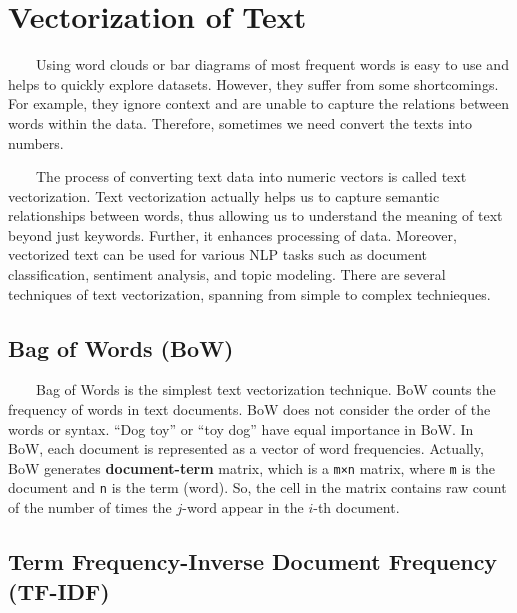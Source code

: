 \documentclass[
  letterpaper,
  DIV=11,
  numbers=noendperiod]{scrreprt}
\begin{document}
\section{Vectorization of Text}\label{vectorization-of-text}

~~~~Using word clouds or bar diagrams of most frequent words is easy to
use and helps to quickly explore datasets. However, they suffer from
some shortcomings. For example, they ignore context and are unable to
capture the relations between words within the data. Therefore,
sometimes we need convert the texts into numbers.

~~~~The process of converting text data into numeric vectors is called
text vectorization. Text vectorization actually helps us to capture
semantic relationships between words, thus allowing us to understand the
meaning of text beyond just keywords. Further, it enhances processing of
data. Moreover, vectorized text can be used for various NLP tasks such
as document classification, sentiment analysis, and topic modeling.
There are several techniques of text vectorization, spanning from simple
to complex technieques.

\subsection{Bag of Words (BoW)}\label{bag-of-words-bow}

~~~~Bag of Words is the simplest text vectorization technique. BoW
counts the frequency of words in text documents. BoW does not consider
the order of the words or syntax. ``Dog toy'' or ``toy dog'' have equal
importance in BoW. In BoW, each document is represented as a vector of
word frequencies. Actually, BoW generates \textbf{document-term} matrix,
which is a \texttt{m×n} matrix, where \texttt{m} is the document and
\texttt{n} is the term (word). So, the cell in the matrix contains raw
count of the number of times the \(j\)-word appear in the \(i\)-th
document.

\subsection{Term Frequency-Inverse Document Frequency
(TF-IDF)}\label{term-frequency-inverse-document-frequency-tf-idf}
\end{document}
